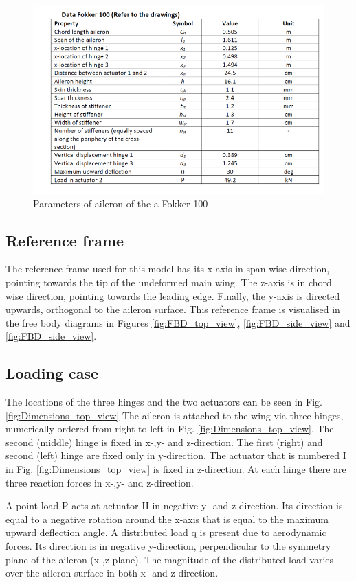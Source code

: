 \begin{figure}[H]
    \centering
    \includegraphics[width=15cm]{Dimensions_table.jpg}
    \caption{Parameters of aileron of the a Fokker 100}
    \label{fig:Parameters_aileron_F100}
\end{figure}

\subsection{Reference frame}
The reference frame used for this model has its x-axis in span wise direction, pointing towards the tip of the undeformed main wing. The z-axis is in chord wise direction, pointing towards the leading edge. Finally, the y-axis is directed upwards, orthogonal to the aileron surface. This reference frame is visualised in the free body diagrams in Figures \ref{fig:FBD_top_view}, \ref{fig:FBD_side_view} and \ref{fig:FBD_side_view}.

\subsection{Loading case}
The locations of the three hinges and the two actuators can be seen in Fig. \ref{fig:Dimensions_top_view}
The aileron is attached to the wing via three hinges, numerically ordered from right to left in Fig. \ref{fig:Dimensions_top_view}. The second (middle) hinge is fixed in x-,y- and z-direction.
The first (right) and second (left) hinge are fixed only in y-direction.
The actuator that is numbered I in Fig. \ref{fig:Dimensions_top_view} is fixed in z-direction.
At each hinge there are three reaction forces in x-,y- and z-direction.
\par
A point load P acts at actuator II in negative y- and z-direction. Its direction is equal to a negative rotation around the x-axis that is equal to the maximum upward deflection angle. 
A distributed load q is present due to aerodynamic forces. Its direction is in negative y-direction, perpendicular to the symmetry plane of the aileron (x-,z-plane). The magnitude of the distributed load varies over the aileron surface in both x- and z-direction. 